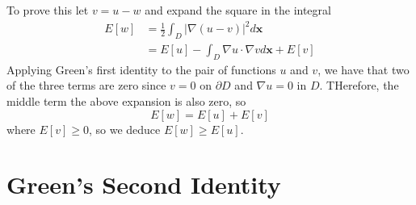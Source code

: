 To prove this let $v = u-w$ and expand the square in the integral \begin{align*}
    E[w] &= \frac{1}{2}\int_D|\nabla(u-v)|^2d\mathbf{x} \\
    &= E[u] - \int_D\nabla u \cdot \nabla vd\mathbf{x} + E[v]
\end{align*}
Applying Green's first identity to the pair of functions $u$ and $v$, we have that two of the three terms are zero since $v = 0$ on $\partial D$ and $\nabla u = 0$ in $D$. THerefore, the middle term the above expansion is also zero, so \begin{equation*}
    E[w] = E[u] + E[v]
\end{equation*}
where $E[v] \geq 0$, so we deduce $E[w] \geq E[u]$.



\section{Green's Second Identity}






